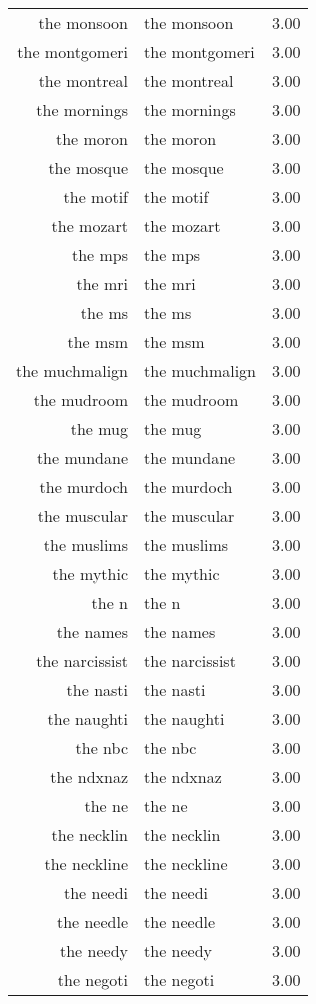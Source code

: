 \begin{table}[ht]
\begin{tabular}{rlr}
  the monsoon & the monsoon & 3.00 \\ 
  the montgomeri & the montgomeri & 3.00 \\ 
  the montreal & the montreal & 3.00 \\ 
  the mornings & the mornings & 3.00 \\ 
  the moron & the moron & 3.00 \\ 
  the mosque & the mosque & 3.00 \\ 
  the motif & the motif & 3.00 \\ 
  the mozart & the mozart & 3.00 \\ 
  the mps & the mps & 3.00 \\ 
  the mri & the mri & 3.00 \\ 
  the ms & the ms & 3.00 \\ 
  the msm & the msm & 3.00 \\ 
  the muchmalign & the muchmalign & 3.00 \\ 
  the mudroom & the mudroom & 3.00 \\ 
  the mug & the mug & 3.00 \\ 
  the mundane & the mundane & 3.00 \\ 
  the murdoch & the murdoch & 3.00 \\ 
  the muscular & the muscular & 3.00 \\ 
  the muslims & the muslims & 3.00 \\ 
  the mythic & the mythic & 3.00 \\ 
  the n & the n & 3.00 \\ 
  the names & the names & 3.00 \\ 
  the narcissist & the narcissist & 3.00 \\ 
  the nasti & the nasti & 3.00 \\ 
  the naughti & the naughti & 3.00 \\ 
  the nbc & the nbc & 3.00 \\ 
  the ndxnaz & the ndxnaz & 3.00 \\ 
  the ne & the ne & 3.00 \\ 
  the necklin & the necklin & 3.00 \\ 
  the neckline & the neckline & 3.00 \\ 
  the needi & the needi & 3.00 \\ 
  the needle & the needle & 3.00 \\ 
  the needy & the needy & 3.00 \\ 
  the negoti & the negoti & 3.00 \\ 

\end{tabular}
\end{table}
